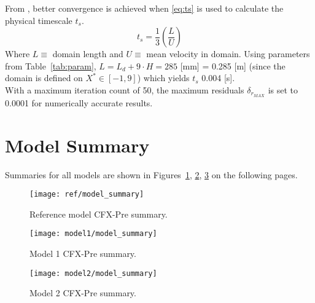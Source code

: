 From \cite{tut}, better convergence is achieved when \ref{eq:ts} is used to calculate the physical timescale $t_s$. 
\begin{equation}
	\label{eq:ts}
	t_s = \frac{1}{3} \left( \frac{L}{U} \right)
\end{equation}
Where $L\equiv$ domain length and $U\equiv$ mean velocity in domain. Using parameters from Table~\ref{tab:param}, $L = L_d + 9\cdot H = 285$ [mm] = 0.285 [m] (since the domain is defined on $X^*\in [-1,9]$) which yields $t_s$ 0.004 [s].\\  

With a maximum iteration count of 50, the maximum residuals $\delta_{r_{MAX}}$ is set to 0.0001 for numerically accurate results.

\section{Model Summary}
\label{sec:pre_summary}

Summaries for all models are shown in Figures~\ref{fig:ref_modsum}, \ref{fig:mod1_modsum},  \ref{fig:mod2_modsum} on the following pages.

\begin{figure}[H]
	\centering
	\texttt{[image: ref/model\_summary]}
	\caption{Reference model CFX-Pre summary.}
	\label{fig:ref_modsum}
\end{figure}
\begin{figure}[H]
	\centering
	\texttt{[image: model1/model\_summary]}
	\caption{Model 1 CFX-Pre summary.}
	\label{fig:mod1_modsum}
\end{figure}
\begin{figure}[H]
	\centering
	\texttt{[image: model2/model\_summary]}
	\caption{Model 2 CFX-Pre summary.}
	\label{fig:mod2_modsum}
\end{figure}